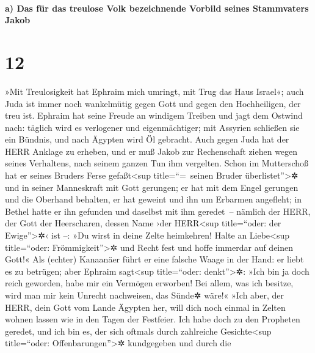 \hypertarget{a-das-fuxfcr-das-treulose-volk-bezeichnende-vorbild-seines-stammvaters-jakob}{%
\paragraph{a) Das für das treulose Volk bezeichnende Vorbild seines
Stammvaters
Jakob}\label{a-das-fuxfcr-das-treulose-volk-bezeichnende-vorbild-seines-stammvaters-jakob}}

\hypertarget{section-11}{%
\section{12}\label{section-11}}

 »Mit Treulosigkeit hat Ephraim mich umringt, mit Trug das
Haus Israel«; auch Juda ist immer noch wankelmütig gegen Gott und gegen
den Hochheiligen, der treu ist.  Ephraim hat seine Freude
an windigem Treiben und jagt dem Ostwind nach: täglich wird es
verlogener und eigenmächtiger; mit Assyrien schließen sie ein Bündnis,
und nach Ägypten wird Öl gebracht.  Auch gegen Juda hat
der HERR Anklage zu erheben, und er muß Jakob zur Rechenschaft ziehen
wegen seines Verhaltens, nach seinem ganzen Tun ihm vergelten.
 Schon im Mutterschoß hat er seines Bruders Ferse
gefaßt\textless sup title=``=~seinen Bruder überlistet''\textgreater✲
und in seiner Manneskraft mit Gott gerungen;  er hat mit
dem Engel gerungen und die Oberhand behalten, er hat geweint und ihn um
Erbarmen angefleht; in Bethel hatte er ihn gefunden und daselbst mit ihm
geredet~--  nämlich der HERR, der Gott der Heerscharen,
dessen Name ›der HERR\textless sup title=``oder: der
Ewige''\textgreater✲‹ ist --:  »Du wirst in deine Zelte
heimkehren! Halte an Liebe\textless sup title=``oder:
Frömmigkeit''\textgreater✲ und Recht fest und hoffe immerdar auf deinen
Gott!«  Als (echter) Kanaanäer führt er eine falsche Waage
in der Hand: er liebt es zu betrügen;  aber Ephraim
sagt\textless sup title=``oder: denkt''\textgreater✲: »Ich bin ja doch
reich geworden, habe mir ein Vermögen erworben! Bei allem, was ich
besitze, wird man mir kein Unrecht nachweisen, das Sünde✲ wäre!«
 »Ich aber, der HERR, dein Gott vom Lande Ägypten her,
will dich noch einmal in Zelten wohnen lassen wie in den Tagen der
Festfeier.  Ich habe doch zu den Propheten geredet, und
ich bin es, der sich oftmals durch zahlreiche Gesichte\textless sup
title=``oder: Offenbarungen''\textgreater✲ kundgegeben und durch die
